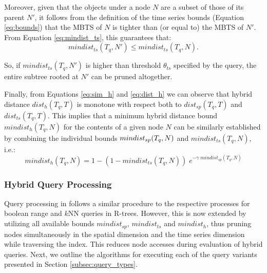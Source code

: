 

Moreover, given that the objects under a node $N$ are a subset of those of its parent $N'$, it follows from the definition of the time series bounds (Equation \ref{eq:bounds}) that the MBTS of $N$ is tighter than (or equal to) the MBTS of $N'$. From Equation \ref{eq:mindist_ts}, this guarantees that:
\begin{equation}
 mindist_{ts}(T_q, N') \leq mindist_{ts}(T_q, N).
\end{equation}

\noindent So, if $mindist_{ts}(T_q, N')$ is higher than threshold $\theta_{ts}$ specified by the query, the entire subtree rooted at $N'$ can be pruned altogether.

Finally,  from Equations \ref{eq:sim_h} and \ref{eq:dist_h} we can observe that hybrid distance $dist_h(T_q, T)$ is monotone with respect both to $dist_{sp}(T_q, T)$ and $dist_{ts}(T_q, T)$. This implies that a minimum hybrid distance bound $mindist_h(T_q, N)$ for the contents of a given node $N$ can be similarly established by combining the individual bounds $mindist_{sp}\\(T_q, N)$ and $mindist_{ts}(T_q, N)$, i.e.:
\begin{equation}
mindist_h(T_q, N) = 1 - (1 - mindist_{ts}(T_q, N)) \; e^{- \gamma \; mindist_{sp}(T_q, N)}
\end{equation}


\subsubsection{Hybrid Query Processing}
\label{subsec:index_query}


Query processing in \tsr follows a similar procedure to the respective processes for boolean range \cite{Guttman1984} and $k$NN queries \cite{hjaltason99tods} in R-trees. However, this is now extended by utilizing all available bounds $mindist_{sp}$, $mindist_{ts}$ and $mindist_h$, thus pruning nodes simultaneously in the spatial dimension and the time series dimension while traversing the index. This reduces node accesses during evaluation of hybrid queries. Next, we outline the algorithms for executing each of the query variants presented in Section \ref{subsec:query_types}.

\label{subsubsec:double_range}

